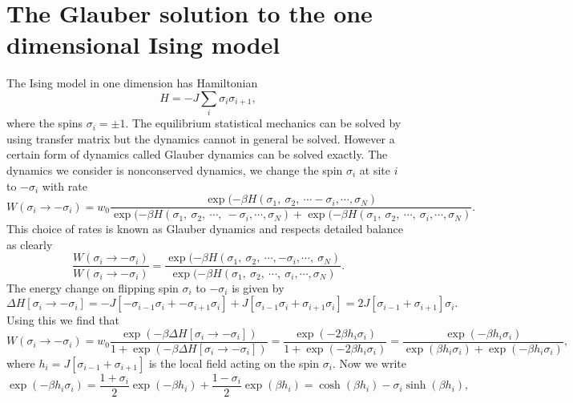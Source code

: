 \documentclass[11pt]{report}
\begin{document}
\section{The Glauber solution to the one dimensional Ising model}
The Ising model in one dimension has Hamiltonian
\begin{equation}
H = -J\sum_{i} \sigma_i\sigma_{i+1},
\end{equation}
where the spins $\sigma_i=\pm1$.
The equilibrium statistical mechanics can be solved by using transfer matrix but the dynamics cannot in general be solved. However a certain form of dynamics called Glauber dynamics can be solved exactly. The dynamics we consider is nonconserved dynamics, we change the  spin $\sigma_i$ at site $i$ to $-\sigma_i$ with rate
\begin{equation}
W(\sigma_i\to-\sigma_i) = w_0\frac{\exp(-\beta H(\sigma_1,\ \sigma_2,\ \cdots -\sigma_i,\cdots, \sigma_N)}{\exp(-\beta H(\sigma_1,\ \sigma_2,\ \cdots,\  -\sigma_i,\cdots, \sigma_N)+ \exp(-\beta H(\sigma_1,\ \sigma_2,\ \cdots ,\ \sigma_i,\cdots, \sigma_N)}.
\end{equation}
This choice of rates is known as Glauber dynamics and respects detailed balance as clearly
\begin{equation}
\frac{W(\sigma_i\to-\sigma_i)}{W(\sigma_i\to-\sigma_i)} = \frac{\exp(-\beta H(\sigma_1,\ \sigma_2,\ \cdots, -\sigma_i,\cdots,\ \sigma_N)}{\exp(-\beta H(\sigma_1,\ \sigma_2,\ \cdots,\ \sigma_i,\cdots, \sigma_N)}.
\end{equation}
The energy change on flipping spin $\sigma_i$ to $-\sigma_i$ is given by
\begin{equation}
\Delta H[\sigma_i\to -\sigma_i]  = -J[-\sigma_{i-1}\sigma_i + -\sigma_{i+1}\sigma_i] + J[\sigma_{i-1}\sigma_i + \sigma_{i+1}\sigma_i]
= 2J[\sigma_{i-1} + \sigma_{i+1}]\sigma_i.
\end{equation}
Using this we find that
\begin{equation}
W(\sigma_i\to-\sigma_i)= w_0\frac{\exp(-\beta \Delta H[\sigma_i\to -\sigma_i])}
{1+ \exp(-\beta \Delta H[\sigma_i\to -\sigma_i])}= \frac{\exp(-2\beta h_i\sigma_i)}
{1+ \exp(-2\beta h_i\sigma_i)}=\frac{\exp(-\beta h_i\sigma_i)}
{\exp(\beta h_i\sigma_i)+ \exp(-\beta h_i\sigma_i)} ,
\end{equation}
where $h_i = J[\sigma_{i-1} + \sigma_{i+1}]$ is the local field acting on the spin $\sigma_i$. Now we write
\begin{equation}
\exp(-\beta h_i\sigma_i)=\frac{1+\sigma_i}{2}\exp(-\beta h_i)+\frac{1-\sigma_i}{2}\exp(\beta h_i) = \cosh(\beta h_i)-\sigma_i \sinh(\beta h_i),
\end{equation}
\end{document}
